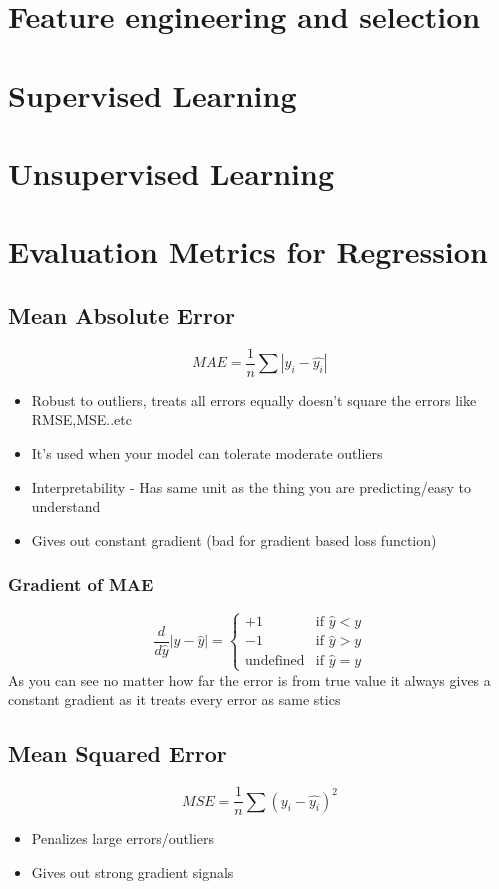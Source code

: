 \documentclass[12pt]{extarticle}
\begin{document}
\section{Feature engineering and selection}


\section{Supervised Learning}
\section{Unsupervised Learning}



\section{Evaluation Metrics for Regression}

\subsection{Mean Absolute Error}  

$$MAE = \frac{1}{n}\sum{|y_i - \hat{y_i}|}$$ 
\begin{itemize}
    \item Robust to outliers, treats all errors equally doesn’t square the errors like RMSE,MSE..etc 
    \item It’s used when your model can tolerate moderate outliers  
    \item Interpretability - Has same unit as the thing you are predicting/easy to understand 
    \item Gives out constant gradient (bad for gradient based loss function) 
\end{itemize}
 
\subsubsection{Gradient of MAE} 
$$
\frac{d}{d\hat{y}}|y - \hat{y}| = 
\begin{cases} 
+1 & \text{if }  \hat{y} < y \\ 
-1 & \text{if }  \hat{y} > y \\ 
\text{undefined} & \text{if } \hat{y} = y 
\end{cases} 
$$
As you can see no matter how far the error is from true value it always gives a constant gradient as it treats every error as same
stics
\subsection{Mean Squared Error}
$$MSE = \frac{1}{n}\sum{(y_i - \hat{y_i})^2}$$ 
\begin{itemize}
    \item Penalizes large errors/outliers 
    \item Gives out strong gradient signals  
\end{itemize}
\end{document}
